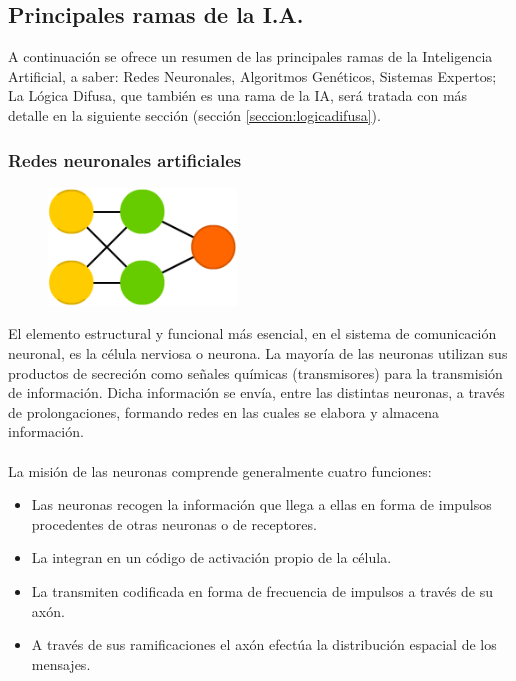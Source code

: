 \subsection{Principales ramas de la I.A.}\label{cap:ramasdelaia}
A continuación se ofrece un resumen de las principales ramas de la Inteligencia Artificial, a saber: Redes Neuronales, Algoritmos Genéticos, Sistemas Expertos; La Lógica Difusa, que también es una rama de la IA, será tratada con más detalle en la siguiente sección (sección \ref{seccion:logicadifusa}).
\subsubsection{Redes neuronales artificiales}

\begin{figure}
	\vspace{-\baselineskip}
	\includegraphics[width=5cm]{Sources/neurona.png}
	\vspace{-\baselineskip}
\end{figure}

El elemento estructural y funcional más esencial, en el sistema de comunicación neuronal, es la célula nerviosa o neurona. La mayoría de las neuronas utilizan sus productos de secreción como señales químicas (transmisores) para la transmisión de información. Dicha información se envía, entre las distintas neuronas, a través de prolongaciones, formando redes en las cuales se elabora y almacena información.
\\\\

La misión de las neuronas comprende generalmente cuatro funciones:
{\setlength{\baselineskip}{0.7\baselineskip}
\begin{itemize}
	\item Las neuronas recogen la información que llega a ellas en forma de impulsos procedentes de otras neuronas o de receptores.
	\item La integran en un código de activación propio de la célula.
	\item La transmiten codificada en forma de frecuencia de impulsos a través de su axón. 
	\item A través de sus ramificaciones el axón efectúa la distribución espacial de los mensajes.
\end{itemize}}

